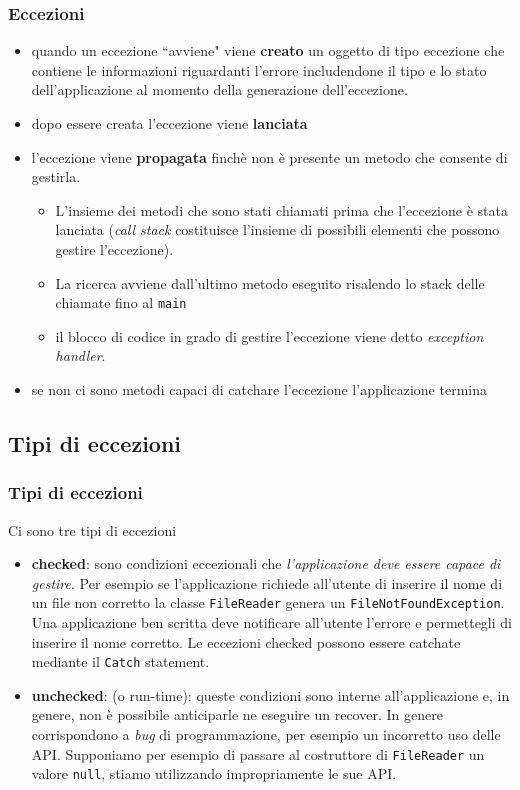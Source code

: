 \documentclass{beamer}
\begin{document}
\begin{frame}
\frametitle{Eccezioni}
\begin{itemize}
\item quando un eccezione ``avviene" viene \textbf{creato} un oggetto di tipo eccezione che contiene le informazioni riguardanti l'errore includendone il tipo e lo stato dell'applicazione al momento della generazione dell'eccezione.
\item dopo essere creata l'eccezione viene \textbf{lanciata}
\item l'eccezione viene \textbf{propagata} finch\`e non \`e presente un metodo che consente di gestirla.
\begin{itemize}
\item L'insieme dei metodi che sono stati chiamati prima che l'eccezione \`e stata lanciata (\emph{call stack} costituisce l'insieme di possibili elementi che possono gestire l'eccezione). 
\item La ricerca avviene dall'ultimo metodo eseguito risalendo lo stack delle chiamate fino al \texttt{main}
\item il blocco di codice in grado di gestire l'eccezione viene detto \emph{exception handler}.
\end{itemize}
\item se non ci sono metodi capaci di catchare l'eccezione l'applicazione termina
\end{itemize}
\end{frame}



\subsection{Tipi di eccezioni}
\begin{frame}
\frametitle{Tipi di eccezioni}
Ci sono tre tipi di eccezioni
\begin{itemize}
\item \textbf{checked}: sono condizioni eccezionali che \emph{l'applicazione deve essere capace di gestire}. Per esempio se l'applicazione richiede all'utente di inserire il nome di un file non corretto la classe \texttt{FileReader} genera un \texttt{FileNotFoundException}. Una applicazione ben scritta deve notificare all'utente l'errore e permettegli di inserire il nome corretto. Le eccezioni checked possono essere catchate mediante il \texttt{Catch} statement.
\item \textbf{unchecked}: (o run-time): queste condizioni sono interne all'applicazione e, in genere, non \`e possibile anticiparle ne eseguire un recover. In genere corrispondono a \emph{bug} di programmazione, per esempio un incorretto uso delle API. Supponiamo per esempio di passare al costruttore di \texttt{FileReader} un valore \texttt{null}, stiamo utilizzando impropriamente le sue API.
\end{itemize}
\end{frame}
\end{document}

